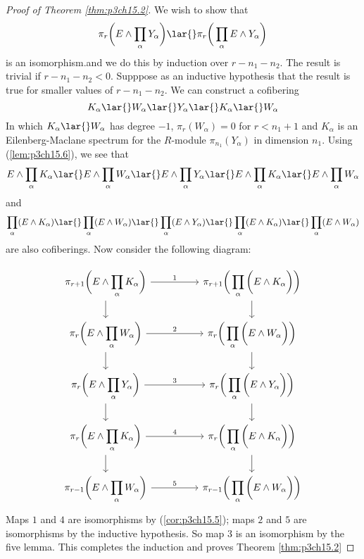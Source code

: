 \documentclass[../main]{subfiles}
\begin{document}
\begin{proof}[Proof of Theorem \ref{thm:p3ch15.2}]
We wish to show that \[\pi_r\bigg(E\wedge \displaystyle\prod_\alpha Y_\alpha\bigg)\lar{} \pi_r\bigg(\displaystyle \prod_\alpha E\wedge Y_\alpha\bigg)\]
is an isomorphism.and we do this by induction over $r-n_1-n_2$. The result is trivial if $r-n_1-n_2<0$. Supppose as an inductive hypothesis that the result is true for smaller values of $r-n_1-n_2$. We can construct a cofibering \[K_\alpha\lar{} W_\alpha \lar{} Y_\alpha \lar{}K_\alpha \lar{} W_\alpha\]
In which $K_\alpha\lar{}W_\alpha$ has degree $-1$, $\pi_r(W_\alpha)=0$ for $r<n_1+1$ and $K_\alpha$ is an Eilenberg-Maclane spectrum for the $R$-module $\pi_{n_1}(Y_\alpha)$ in dimension $n_1$. Using (\ref{lem:p3ch15.6}), we see that 
\[E\wedge \displaystyle \prod_\alpha K_\alpha\lar{}E\wedge \displaystyle \prod_\alpha W_\alpha \lar{} E\wedge \displaystyle \prod_\alpha Y_\alpha \lar{}E\wedge \displaystyle \prod_\alpha K_\alpha \lar{}E\wedge \displaystyle \prod_\alpha W_\alpha\]
and \[ \displaystyle\prod_\alpha(E\wedge K_\alpha)\lar{}\displaystyle\prod_\alpha(E\wedge  W_\alpha) \lar{} \displaystyle\prod_\alpha(E\wedge Y_\alpha )\lar{}\displaystyle\prod_\alpha(E\wedge K_\alpha )\lar{} \displaystyle\prod_\alpha(E\wedge W_\alpha)\]
are also cofiberings. Now consider the following diagram:

\[\begin{tikzcd}
	{\pi_{r+1}\bigg(E\wedge \displaystyle\prod_\alpha K_\alpha \bigg)} && {\pi_{r+1}\bigg(\displaystyle\prod_\alpha\bigg(E\wedge  K_\alpha \bigg)\bigg)} \\
	{\pi_r\bigg(E\wedge \displaystyle\prod_\alpha W_\alpha \bigg)} && {\pi_{r}\bigg(\displaystyle\prod_\alpha\bigg(E\wedge  W_\alpha \bigg)\bigg)} \\
	{\pi_{r}\bigg(E\wedge \displaystyle\prod_\alpha Y_\alpha \bigg)} && {\pi_{r}\bigg(\displaystyle\prod_\alpha\bigg(E\wedge  Y_\alpha \bigg)\bigg)} \\
	{\pi_{r}\bigg(E\wedge \displaystyle\prod_\alpha K_\alpha \bigg)} && {\pi_{r}\bigg(\displaystyle\prod_\alpha\bigg(E\wedge  K_\alpha \bigg)\bigg)} \\
	{\pi_{r-1}\bigg(E\wedge \displaystyle\prod_\alpha W_\alpha \bigg)} && {\pi_{r-1}\bigg(\displaystyle\prod_\alpha\bigg(E\wedge  W_\alpha \bigg)\bigg)}
	\arrow["1", from=1-1, to=1-3]
	\arrow["2", from=2-1, to=2-3]
	\arrow["3", from=3-1, to=3-3]
	\arrow["4", from=4-1, to=4-3]
	\arrow["5", from=5-1, to=5-3]
	\arrow[from=1-1, to=2-1]
	\arrow[from=2-1, to=3-1]
	\arrow[from=3-1, to=4-1]
	\arrow[from=4-1, to=5-1]
	\arrow[from=1-3, to=2-3]
	\arrow[from=2-3, to=3-3]
	\arrow[from=3-3, to=4-3]
	\arrow[from=4-3, to=5-3]
\end{tikzcd}\]
Maps $1$ and $4$ are isomorphisms by (\ref{cor:p3ch15.5}); maps $2$ and $5$ are isomorphisms by the inductive hypothesis. So map $3$ is an isomorphism by the five lemma. This completes the induction and proves Theorem \ref{thm:p3ch15.2}
\end{proof}
\end{document}
